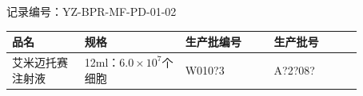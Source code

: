 \documentclass[UTF8,10pt,a4paper,fontset=fandol]{ctexart}
\newcommand{\fieldvalue}[1]{#1}
\newcommand{\handwritten}[1]{#1}
\begin{document}
\noindent
记录编号：YZ-BPR-MF-PD-01-02\hfill

\begin{tabular}{|p{0.18\linewidth}|p{0.25\linewidth}|p{0.22\linewidth}|p{0.22\linewidth}|}
\hline
\centering 品名 &
\centering 规格 &
\centering 生产批编号 &
\centering 生产批号 \\
\hline
\centering \fieldvalue{艾米迈托赛注射液} &
\centering \fieldvalue{12ml：$6.0\times10^{7}$个细胞} &
\centering \fieldvalue{\handwritten{W010?3}} &
\centering \fieldvalue{\handwritten{A?2?08?}} \\
\hline
\end{tabular}

\vspace{2pt}
\end{document}
